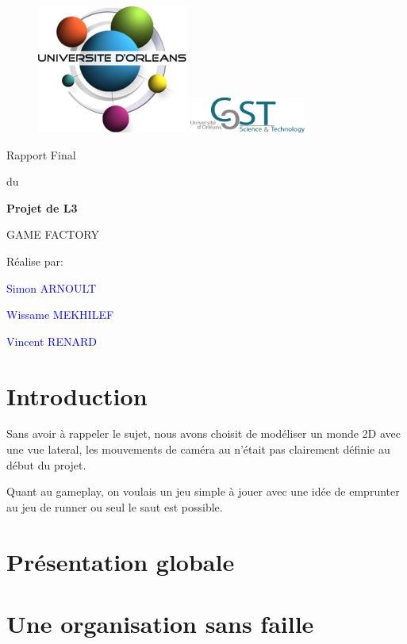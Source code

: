 \documentclass[french,12pt]{article}
\newcommand{\ml}[0]{\par\noindent}
\begin{document}
\thispagestyle{empty}
%
\begin{figure}[H]
\includegraphics[width=0.2\linewidth]{logo_univ.png}
\hfill
\includegraphics[width=1.5in]{logo_ufr.png}
\end{figure}
\vspace{2cm}
%
\begin{center}
{\Huge Rapport Final}
\par\vspace{0.4cm}
{\Large du}
\par\vspace{0.cm}
{\Huge\bf Projet de L3}
\par\vspace{3cm}
{\Huge       GAME FACTORY}
\par\vspace{3cm}
{\Huge       Réalise par:}
\par\vspace{0.3cm}
{\Huge\bf \textcolor{blue}{Simon ARNOULT \ml Wissame MEKHILEF \ml Vincent RENARD}}
\end{center}
\newpage
\tableofcontents
\newpage


\section{Introduction}

Sans avoir à rappeler le sujet, nous avons choisit de modéliser un monde 2D avec une vue lateral, les mouvements de caméra au n'était pas clairement définie au début du projet.
\ml
Quant au gameplay, on voulais un jeu simple à jouer avec une idée de emprunter au jeu de runner ou seul le saut est possible.



\section{Présentation globale}



\section{Une organisation sans faille}
\end{document}
